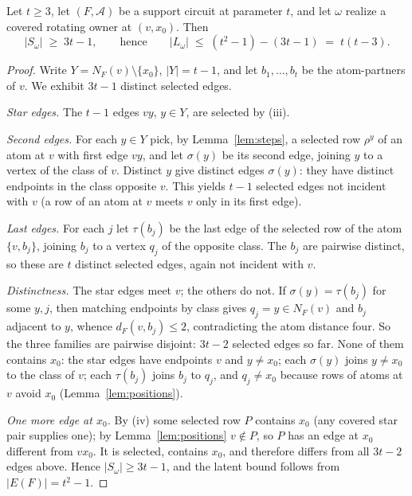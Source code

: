 \begin{theorem}\label{thm:selected}
Let \(t\ge3\), let \((F,\mathcal A)\) be a support circuit at
parameter \(t\), and let \(\omega\) realize a covered rotating owner
at \((v,x_0)\). Then
\[
|S_\omega|\;\ge\;3t-1,
\qquad\text{hence}\qquad
|L_\omega|\;\le\;(t^2-1)-(3t-1)\;=\;t(t-3).
\]
\end{theorem}

\begin{proof}
Write \(Y=N_F(v)\setminus\{x_0\}\), \(|Y|=t-1\), and let
\(b_1,\dots,b_t\) be the atom-partners of \(v\). We exhibit \(3t-1\)
distinct selected edges.

\emph{Star edges.} The \(t-1\) edges \(vy\), \(y\in Y\), are selected
by (iii).

\emph{Second edges.} For each \(y\in Y\) pick, by
Lemma~\ref{lem:steps}, a selected row \(\rho^y\) of an atom at \(v\)
with first edge \(vy\), and let \(\sigma(y)\) be its second edge,
joining \(y\) to a vertex of the class of \(v\). Distinct \(y\) give
distinct edges \(\sigma(y)\): they have distinct endpoints in the
class opposite \(v\). This yields \(t-1\) selected edges not incident
with \(v\) (a row of an atom at \(v\) meets \(v\) only in its first
edge).

\emph{Last edges.} For each \(j\) let \(\tau(b_j)\) be the last edge
of the selected row of the atom \(\{v,b_j\}\), joining \(b_j\) to a
vertex \(q_j\) of the opposite class. The \(b_j\) are pairwise
distinct, so these are \(t\) distinct selected edges, again not
incident with \(v\).

\emph{Distinctness.} The star edges meet \(v\); the others do not. If
\(\sigma(y)=\tau(b_j)\) for some \(y,j\), then matching endpoints by
class gives \(q_j=y\in N_F(v)\) and \(b_j\) adjacent to \(y\), whence
\(d_F(v,b_j)\le2\), contradicting the atom distance four. So the three
families are pairwise disjoint: \(3t-2\) selected edges so far. None
of them contains \(x_0\): the star edges have endpoints
\(v\) and \(y\neq x_0\); each \(\sigma(y)\) joins \(y\neq x_0\) to the
class of \(v\); each \(\tau(b_j)\) joins \(b_j\) to \(q_j\), and
\(q_j\neq x_0\) because rows of atoms at \(v\) avoid \(x_0\)
(Lemma~\ref{lem:positions}).

\emph{One more edge at \(x_0\).} By (iv) some selected row \(P\)
contains \(x_0\) (any covered star pair supplies one); by
Lemma~\ref{lem:positions} \(v\notin P\), so \(P\) has an edge at
\(x_0\) different from \(vx_0\). It is selected, contains \(x_0\), and
therefore differs from all \(3t-2\) edges above. Hence
\(|S_\omega|\ge3t-1\), and the latent bound follows from
\(|E(F)|=t^2-1\).
\end{proof}


